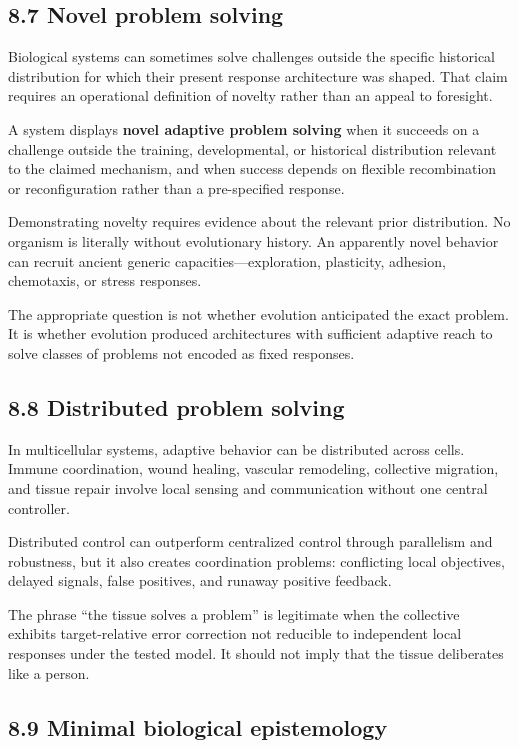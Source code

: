 \documentclass[
  11pt,
]{article}
\begin{document}
\subsection{8.7 Novel problem solving}\label{novel-problem-solving}

Biological systems can sometimes solve challenges outside the specific
historical distribution for which their present response architecture
was shaped. That claim requires an operational definition of novelty
rather than an appeal to foresight.

A system displays \textbf{novel adaptive problem solving} when it
succeeds on a challenge outside the training, developmental, or
historical distribution relevant to the claimed mechanism, and when
success depends on flexible recombination or reconfiguration rather than
a pre-specified response.

Demonstrating novelty requires evidence about the relevant prior
distribution. No organism is literally without evolutionary history. An
apparently novel behavior can recruit ancient generic
capacities---exploration, plasticity, adhesion, chemotaxis, or stress
responses.

The appropriate question is not whether evolution anticipated the exact
problem. It is whether evolution produced architectures with sufficient
adaptive reach to solve classes of problems not encoded as fixed
responses.

\subsection{8.8 Distributed problem
solving}\label{distributed-problem-solving}

In multicellular systems, adaptive behavior can be distributed across
cells. Immune coordination, wound healing, vascular remodeling,
collective migration, and tissue repair involve local sensing and
communication without one central controller.

Distributed control can outperform centralized control through
parallelism and robustness, but it also creates coordination problems:
conflicting local objectives, delayed signals, false positives, and
runaway positive feedback.

The phrase ``the tissue solves a problem'' is legitimate when the
collective exhibits target-relative error correction not reducible to
independent local responses under the tested model. It should not imply
that the tissue deliberates like a person.

\subsection{8.9 Minimal biological
epistemology}\label{minimal-biological-epistemology}
\end{document}
